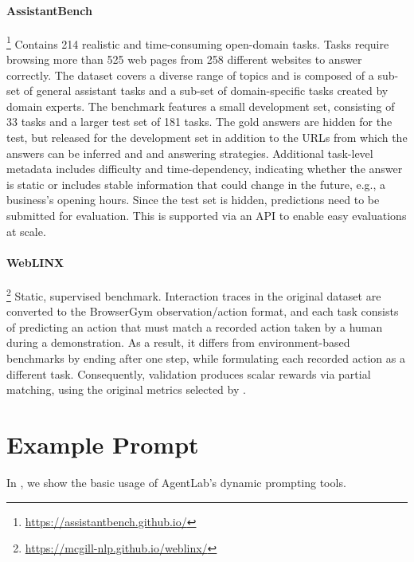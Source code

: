 \documentclass[10pt]{article} %
\begin{document}
\paragraph{AssistantBench}\footnote{\url{https://assistantbench.github.io/}} \citep{assistant-bench} Contains 214 realistic and time-consuming open-domain tasks. Tasks require browsing more than 525 web pages from 258 different websites to answer correctly. The dataset covers a diverse range of topics and is composed of a sub-set of general assistant tasks and a sub-set of domain-specific tasks created by domain experts.
%
The benchmark features a small development set, consisting of 33 tasks and a larger test set of 181 tasks. The gold answers are hidden for the test, but released for the development set in addition to the URLs from which the answers can be inferred and and answering strategies.
Additional task-level metadata includes difficulty and time-dependency, indicating whether the answer is static or includes stable information that could change in the future, e.g., a business's opening hours.
Since the test set is hidden, predictions need to be submitted for evaluation. This is supported via an API to enable easy evaluations at scale.

\paragraph{WebLINX}\footnote{\url{https://mcgill-nlp.github.io/weblinx/}} \citep{weblinx} Static, supervised benchmark. Interaction traces in the original dataset are converted to the BrowserGym observation/action format, and each task consists of predicting an action that must match a recorded action taken by a human during a demonstration. As a result, it differs from environment-based benchmarks by ending after one step, while formulating each recorded action as a different task. Consequently, validation produces scalar rewards via partial matching, using the original metrics selected by \citet{weblinx}.

\clearpage
\section{Example Prompt}\label{sec:prompt-example}

In , we show the basic usage of AgentLab's dynamic prompting tools.
\end{document}
